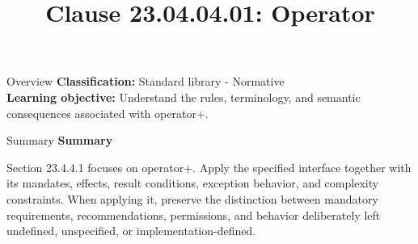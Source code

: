 \documentclass[10pt,letterpaper]{article}
\title{Clause 23.04.04.01: Operator}
\author{}
\date{}
\begin{document}
\maketitle
\begin{CornellOverviewBox}{Overview}
\textbf{Classification:} Standard library - Normative\\[2pt]
\textbf{Learning objective:} Understand the rules, terminology, and semantic consequences associated with operator+.
\end{CornellOverviewBox}\begin{CornellSummaryBox}{Summary}
{\sffamily\bfseries\color{Accent} Summary}\par\vspace{3pt}Section 23.4.4.1 focuses on operator+. Apply the specified interface together with its mandates, effects, result conditions, exception behavior, and complexity constraints. When applying it, preserve the distinction between mandatory requirements, recommendations, permissions, and behavior deliberately left undefined, unspecified, or implementation-defined.
\end{CornellSummaryBox}
\end{document}
